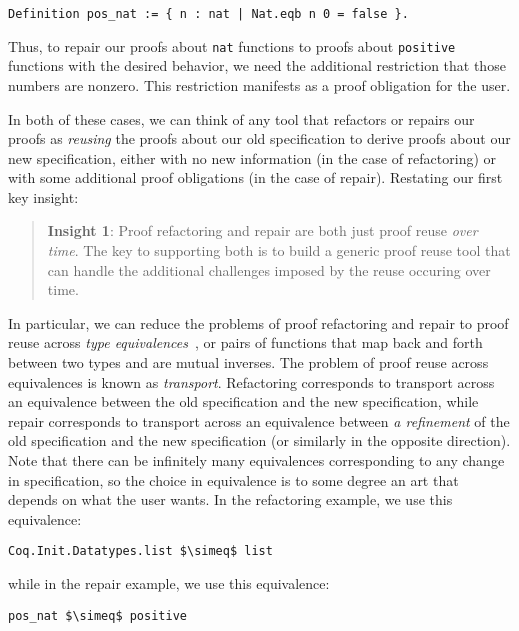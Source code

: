 \begin{lstlisting}
Definition pos_nat := { n : nat | Nat.eqb n 0 = false }.
\end{lstlisting}
Thus, to repair our proofs about \lstinline{nat} functions to proofs about \lstinline{positive} functions with the desired behavior,
we need the additional restriction that those numbers are nonzero. 
This restriction manifests as a proof obligation for the user.

In both of these cases, we can think of any tool that refactors or repairs our proofs as
\textit{reusing} the proofs about our old specification to derive proofs about our new specification,
either with no new information (in the case of refactoring) or with some additional proof obligations (in the case of repair).
Restating our first key insight:

\begin{quote}
\textbf{Insight 1}:
Proof refactoring and repair are both just 
proof reuse %
\textit{over time}. The key to supporting both is to build a generic proof reuse
tool that can handle the additional challenges imposed by the reuse occuring over time. 
\end{quote}
In particular, we can reduce the problems of proof refactoring and repair to proof reuse across \textit{type equivalences}~\cite{univalent2013homotopy},
or pairs of functions that map back and forth between two types and are mutual inverses.
The problem of proof reuse across equivalences is known as \textit{transport}. %
Refactoring corresponds to transport across an equivalence between the old specification and the new specification,
while repair corresponds to transport across an equivalence between \textit{a refinement} of the old specification
and the new specification (or similarly in the opposite direction).
Note that there can be infinitely many equivalences corresponding to any change in specification,
so the choice in equivalence is to some degree an art that depends on what the user wants.
In the refactoring example, we use this equivalence:

\begin{lstlisting}
Coq.Init.Datatypes.list $\simeq$ list
\end{lstlisting}
while in the repair example, we use this equivalence:

\begin{lstlisting}
pos_nat $\simeq$ positive
\end{lstlisting}

